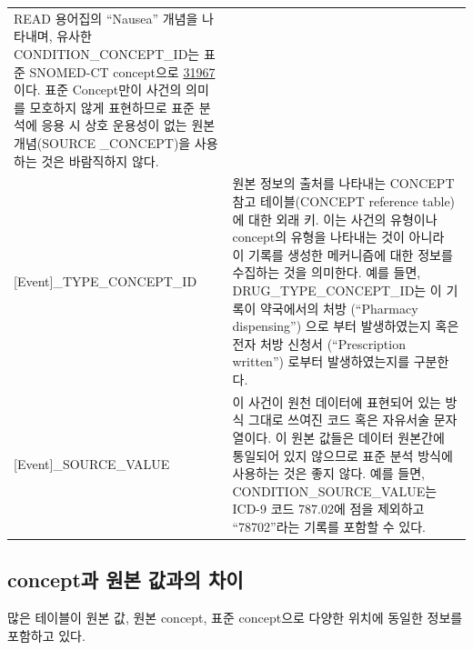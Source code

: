 \documentclass[11pt]{book}
\theoremstyle{definition}
\theoremstyle{definition}
\theoremstyle{definition}
\theoremstyle{remark}
\begin{document}
\begin{longtable}[]{@{}ll@{}}
\begin{minipage}[t]{0.60\columnwidth}
READ 용어집의 ``Nausea'' 개념을 나타내며, 유사한
CONDITION\_CONCEPT\_ID는 표준 SNOMED-CT concept으로
\href{http://athena.ohdsi.org/search-terms/terms/31967}{31967}이다. 표준
Concept만이 사건의 의미를 모호하지 않게 표현하므로 표준 분석에 응용 시
상호 운용성이 없는 원본 개념(SOURCE \_CONCEPT)을 사용하는 것은
바람직하지 않다.\strut
\end{minipage}\tabularnewline
\begin{minipage}[t]{0.34\columnwidth}\raggedright\strut
{[}Event{]}\_TYPE\_CONCEPT\_ID\strut
\end{minipage} & \begin{minipage}[t]{0.60\columnwidth}\raggedright\strut
원본 정보의 출처를 나타내는 CONCEPT 참고 테이블(CONCEPT reference
table)에 대한 외래 키. 이는 사건의 유형이나 concept의 유형을 나타내는
것이 아니라 이 기록를 생성한 메커니즘에 대한 정보를 수집하는 것을
의미한다. 예를 들면, DRUG\_TYPE\_CONCEPT\_ID는 이 기록이 약국에서의 처방
(``Pharmacy dispensing'') 으로 부터 발생하였는지 혹은 전자 처방 신청서
(``Prescription written'') 로부터 발생하였는지를 구분한다.\strut
\end{minipage}\tabularnewline
\begin{minipage}[t]{0.34\columnwidth}\raggedright\strut
{[}Event{]}\_SOURCE\_VALUE\strut
\end{minipage} & \begin{minipage}[t]{0.60\columnwidth}\raggedright\strut
이 사건이 원천 데이터에 표현되어 있는 방식 그대로 쓰여진 코드 혹은
자유서술 문자열이다. 이 원본 값들은 데이터 원본간에 통일되어 있지
않으므로 표준 분석 방식에 사용하는 것은 좋지 않다. 예를 들면,
CONDITION\_SOURCE\_VALUE는 ICD-9 코드 787.02에 점을 제외하고
``78702''라는 기록를 포함할 수 있다.\strut
\end{minipage}\tabularnewline
\bottomrule
\end{longtable}

\subsection{concept과 원본 값과의 차이}\label{concepts-Sources}

많은 테이블이 원본 값, 원본 concept, 표준 concept으로 다양한 위치에
동일한 정보를 포함하고 있다.
\end{document}

